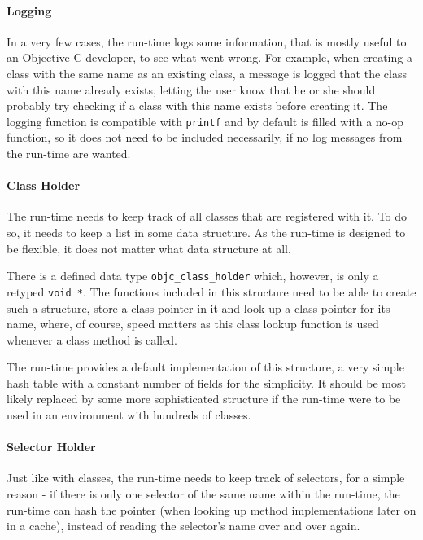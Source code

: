 \paragraph{Logging}

In a very few cases, the run-time logs some information, that is mostly useful to an Objective-C developer, to see what went wrong. For example, when creating a class with the same name as an existing class, a message is logged that the class with this name already exists, letting the user know that he or she should probably try checking if a class with this name exists before creating it. The logging function is compatible with \verb=printf= and by default is filled with a no-op function, so it does not need to be included necessarily, if no log messages from the run-time are wanted.

\paragraph{Class Holder}

The run-time needs to keep track of all classes that are registered with it. To do so, it needs to keep a list in some data structure. As the run-time is designed to be flexible, it does not matter what data structure at all.

There is a defined data type \verb=objc_class_holder= which, however, is only a retyped \verb=void *=. The functions included in this structure need to be able to create such a structure, store a class pointer in it and look up a class pointer for its name, where, of course, speed matters as this class lookup function is used whenever a class method is called.

The run-time provides a default implementation of this structure, a very simple hash table with a constant number of fields for the simplicity. It should be most likely replaced by some more sophisticated structure if the run-time were to be used in an environment with hundreds of classes.

\paragraph{Selector Holder}

Just like with classes, the run-time needs to keep track of selectors, for a simple reason - if there is only one selector of the same name within the run-time, the run-time can hash the pointer (when looking up method implementations later on in a cache), instead of reading the selector's name over and over again.

